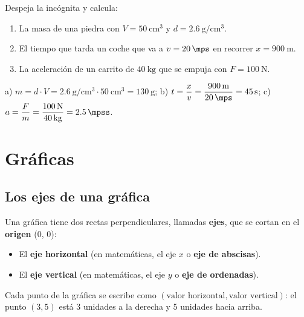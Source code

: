 \begin{exercise}
    Despeja la incógnita y calcula:
    \begin{enumerate}[label=\letraminuscula]
        \item La masa de una piedra con \(V = \qty{50}{\cubic\cm}\) y \(d = \qty{2.6}{\g\per\cubic\cm}\).
        \item El tiempo que tarda un coche que va a \(v = \qty{20}{\mps}\) en recorrer \(x = \qty{900}{\m}\).
        \item La aceleración de un carrito de \(\qty{40}{\kg}\) que se empuja con \(F = \qty{100}{\newton}\).
    \end{enumerate}
    \begin{solu}
        a) \(m = d \cdot V = \qty{2.6}{\g\per\cubic\cm} \cdot \qty{50}{\cubic\cm} = \qty{130}{\g}\); \quad
        b) \(t = \dfrac{x}{v} = \dfrac{\qty{900}{\m}}{\qty{20}{\mps}} = \qty{45}{\s}\); \quad
        c) \(a = \dfrac{F}{m} = \dfrac{\qty{100}{\newton}}{\qty{40}{\kg}} = \qty{2.5}{\mpss}\).
    \end{solu}
\end{exercise}


\section{Gráficas}

\subsection{Los ejes de una gráfica}

Una gráfica tiene dos rectas perpendiculares, llamadas \textbf{ejes}, que se cortan en el \textbf{origen} (0, 0):
\begin{itemize}
    \item El \textbf{eje horizontal} (en matemáticas, el eje \(x\) o \textbf{eje de abscisas}).
    \item El \textbf{eje vertical} (en matemáticas, el eje \(y\) o \textbf{eje de ordenadas}).
\end{itemize}
Cada punto de la gráfica se escribe como \((\text{valor horizontal}, \text{valor vertical})\): el punto \((3, 5)\) está 3 unidades a la derecha y 5 unidades hacia arriba.

